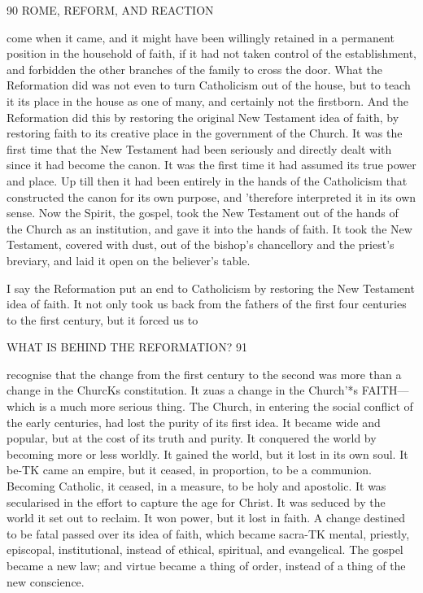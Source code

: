 \documentclass[12pt,a5paper,twoside]{book}
\begin{document}
90 ROME, REFORM, AND REACTION 

come when it came, and it might have been willingly 
retained in a permanent position in the household of 
faith, if it had not taken control of the establishment, 
and forbidden the other branches of the family to 
cross the door. What the Reformation did was not 
even to turn Catholicism out of the house, but to 
teach it its place in the house as one of many, and 
certainly not the firstborn. And the Reformation did 
this by restoring the original New Testament idea of 
faith, by restoring faith to its creative place in the 
government of the Church. It was the first time 
that the New Testament had been seriously and 
directly dealt with since it had become the canon. It 
was the first time it had assumed its true power and 
place. Up till then it had been entirely in the hands 
of the Catholicism that constructed the canon for its 
own purpose, and 'therefore interpreted it in its own 
sense. Now the Spirit, the gospel, took the New 
Testament out of the hands of the Church as an 
institution, and gave it into the hands of faith. It 
took the New Testament, covered with dust, out of 
the bishop's chancellory and the priest's breviary, and 
laid it open on the believer's table. 

I say the Reformation put an end to Catholicism 
by restoring the New Testament idea of faith. It 
not only took us back from the fathers of the first 
four centuries to the first century, but it forced us to 



WHAT IS BEHIND THE REFORMATION? 91 

recognise that the change from the first century to the 
second was more than a change in the ChurcKs constitution. 
It zuas a change in the Church'*s FAITH---which is a 
much more serious thing. The Church, in entering 
the social conflict of the early centuries, had lost the 
purity of its first idea. It became wide and popular, 
but at the cost of its truth and purity. It conquered 
the world by becoming more or less worldly. It 
gained the world, but it lost in its own soul. It be-TK
came an empire, but it ceased, in proportion, to be 
a communion. Becoming Catholic, it ceased, in a 
measure, to be holy and apostolic. It was secularised 
in the effort to capture the age for Christ. It was 
seduced by the world it set out to reclaim. It won 
power, but it lost in faith. A change destined to be 
fatal passed over its idea of faith, which became sacra-TK
mental, priestly, episcopal, institutional, instead of 
ethical, spiritual, and evangelical. The gospel became 
a new law; and virtue became a thing of order, 
instead of a thing of the new conscience. 
\end{document}
